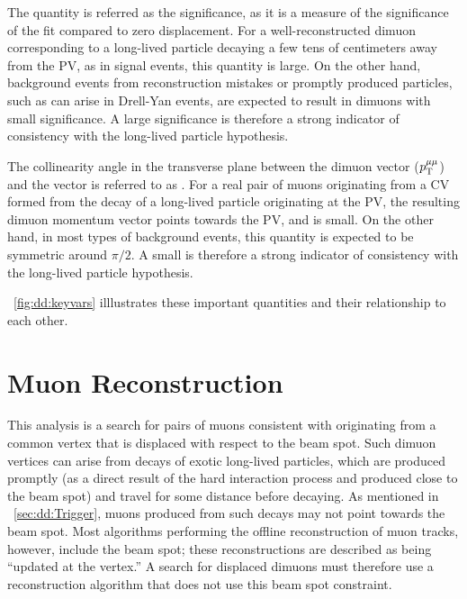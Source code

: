 The quantity \LxySig is referred as the \Lxy significance, as it is a measure of the significance of the fit compared to zero displacement.
For a well-reconstructed dimuon corresponding to a long-lived particle decaying a few tens of centimeters away from the PV, as in signal events, this quantity is large.
On the other hand, background events from reconstruction mistakes or promptly produced particles, such as can arise in Drell-Yan events, are expected to result in dimuons with small \Lxy significance.
A large \Lxy significance is therefore a strong indicator of consistency with the long-lived particle hypothesis.

The collinearity angle in the transverse plane between the dimuon \pT vector ($p_{\mathrm{T}}^{\mathrm{\mu}\mathrm{\mu}}$) and the \Lxy vector is referred to as \DeltaPhi.
For a real pair of muons originating from a CV formed from the decay of a long-lived particle originating at the PV, the resulting dimuon momentum vector points towards the PV, and \DeltaPhi is small.
On the other hand, in most types of background events, this quantity is expected to be symmetric around $\pi/2$.
A small \DeltaPhi is therefore a strong indicator of consistency with the long-lived particle hypothesis.

\Fig~\ref{fig:dd:keyvars} illlustrates these important quantities and their relationship to each other.

\section{Muon Reconstruction}
This analysis is a search for pairs of muons consistent with originating from a common vertex that is displaced with respect to the beam spot.
Such dimuon vertices can arise from decays of exotic long-lived particles, which are produced promptly (as a direct result of the hard interaction process and produced close to the beam spot) and travel for some distance before decaying.
As mentioned in \Sec~\ref{sec:dd:Trigger}, muons produced from such decays may not point towards the beam spot.
Most algorithms performing the offline reconstruction of muon tracks, however, include the beam spot; these reconstructions are described as being ``updated at the vertex.''
A search for displaced dimuons must therefore use a reconstruction algorithm that does not use this beam spot constraint.

